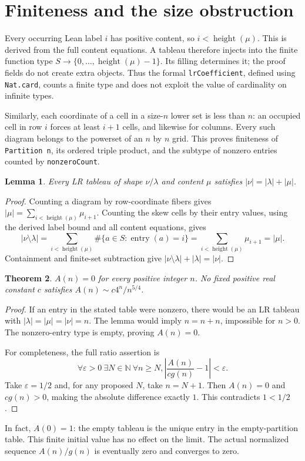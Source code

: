 \documentclass[11pt]{article}
\newtheorem{theorem}{Theorem}
\newtheorem{lemma}[theorem]{Lemma}
\newcommand{\N}{\mathbb N}
\begin{document}
\section{Finiteness and the size obstruction}
Every occurring Lean label $i$ has positive content, so
$i<\operatorname{height}(\mu)$. This is derived from the full content
equations. A tableau therefore injects into the finite function type
$S\to\{0,\ldots,\operatorname{height}(\mu)-1\}$. Its filling determines it;
the proof fields do not create extra objects. Thus the formal
\texttt{lrCoefficient}, defined using \texttt{Nat.card}, counts a finite
type and does not exploit the value of cardinality on infinite types.

Similarly, each coordinate of a cell in a size-$n$ lower set is less than
$n$: an occupied cell in row $i$ forces at least $i+1$ cells, and likewise
for columns. Every such diagram belongs to the powerset of an $n$ by $n$
grid. This proves finiteness of \texttt{Partition n}, its ordered triple
product, and the subtype of nonzero entries counted by \texttt{nonzeroCount}.

\begin{lemma}
Every LR tableau of shape $\nu/\lambda$ and content $\mu$ satisfies
$|\nu|=|\lambda|+|\mu|$.
\end{lemma}
\begin{proof}
Counting a diagram by row-coordinate fibers gives
$|\mu|=\sum_{i<\operatorname{height}(\mu)}\mu_{i+1}$.
Counting the skew cells by their entry values, using the derived label bound
and all content equations, gives
\[
 |\nu\setminus\lambda|
 =\sum_{i<\operatorname{height}(\mu)}
       \#\{a\in S:\operatorname{entry}(a)=i\}
 =\sum_{i<\operatorname{height}(\mu)}\mu_{i+1}=|\mu|.
\]
Containment and finite-set subtraction give
$|\nu\setminus\lambda|+|\lambda|=|\nu|$.
\end{proof}

\begin{theorem}
$A(n)=0$ for every positive integer $n$. No fixed positive real constant
$c$ satisfies $A(n)\sim c4^n/n^{5/4}$.
\end{theorem}
\begin{proof}
If an entry in the stated table were nonzero, there would be an LR tableau
with $|\lambda|=|\mu|=|\nu|=n$. The lemma would imply $n=n+n$, impossible
for $n>0$. The nonzero-entry type is empty, proving $A(n)=0$.

For completeness, the full ratio assertion is
\[
 \forall\varepsilon>0\ \exists N\in\N\ \forall n\ge N,
       \left|\frac{A(n)}{c g(n)}-1\right|<\varepsilon.
\]
Take $\varepsilon=1/2$ and, for any proposed $N$, take $n=N+1$.
Then $A(n)=0$ and $c g(n)>0$, making the absolute difference exactly $1$.
This contradicts $1<1/2$.
\end{proof}
In fact, $A(0)=1$: the empty tableau is the unique entry in the empty-partition
table. This finite initial value has no effect on the limit. The actual
normalized sequence $A(n)/g(n)$ is eventually zero and converges to zero.
\end{document}
